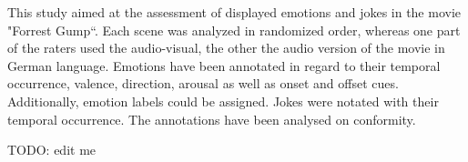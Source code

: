 This study aimed at the assessment of displayed emotions and jokes in the movie
"Forrest Gump“. Each scene was analyzed in randomized order, whereas one part
of the raters used the audio-visual, the other the audio version of the movie
in German language. Emotions have been annotated in regard to their temporal
occurrence, valence, direction, arousal as well as onset and offset cues.
Additionally, emotion labels could be assigned. Jokes were notated with their
temporal occurrence. The annotations have been analysed on conformity.

TODO: edit me
